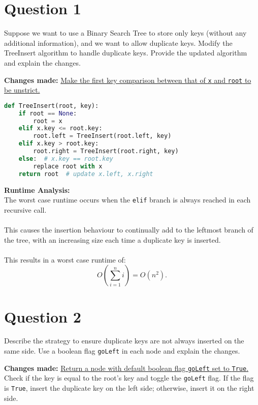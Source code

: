 \documentclass[12pt]{article}
\begin{document}
\renewcommand{\familydefault}{\rmdefault}

\section*{Question 1}
Suppose we want to use a Binary Search Tree to store only keys (without any additional information), and we want to allow duplicate keys. Modify the TreeInsert algorithm to handle duplicate keys. Provide the updated algorithm and explain the changes.

\vspace{1em} %
\textbf{Changes made:} \underline{Make the first key comparison between that of \texttt{x} and \texttt{root} to be unstrict.}

\begin{lstlisting}[language=Python, caption={Modified TreeInsert Algorithm}]
def TreeInsert(root, key):
    if root == None:
        root = x
    elif x.key <= root.key:
        root.left = TreeInsert(root.left, key)
    elif x.key > root.key:
        root.right = TreeInsert(root.right, key)
    else:  # x.key == root.key
        replace root with x
    return root  # update x.left, x.right
\end{lstlisting}
\textbf{Runtime Analysis:} \\
The worst case runtime occurs when the \texttt{elif} branch is always reached in each recursive call. \\
\\
This causes the insertion behaviour to continually add to the leftmost branch of the tree, with an increasing size each time a duplicate key is inserted. \\
\\
This results in a worst case runtime of:
\[
    O(\sum_{i=1}^{n} i) = O(n^2) \text{.}
\]

\pagebreak

\section*{Question 2}
Describe the strategy to ensure duplicate keys are not always inserted on the same side. Use a boolean flag \texttt{goLeft} in each node and explain the changes.

\vspace{1em} %
\textbf{Changes made:} \underline{Return a node with default boolean flag \texttt{goLeft} set to \texttt{True}.} Check if the key is equal to the root's key and toggle the \texttt{goLeft} flag. If the flag is \texttt{True}, insert the duplicate key on the left side; otherwise, insert it on the right side.
\end{document}
